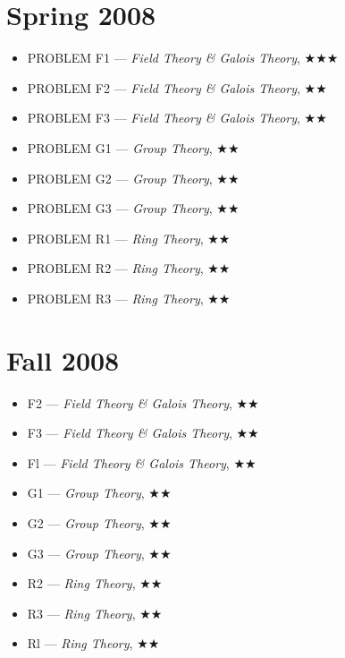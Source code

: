 \documentclass[11pt,letterpaper]{book}
\begin{document}
\section*{Spring 2008}
\begin{itemize}
\item PROBLEM F1 --- \textit{Field Theory \& Galois Theory}, $\bigstar\bigstar\bigstar$
\item PROBLEM F2 --- \textit{Field Theory \& Galois Theory}, $\bigstar\bigstar$
\item PROBLEM F3 --- \textit{Field Theory \& Galois Theory}, $\bigstar\bigstar$
\item PROBLEM G1 --- \textit{Group Theory}, $\bigstar\bigstar$
\item PROBLEM G2 --- \textit{Group Theory}, $\bigstar\bigstar$
\item PROBLEM G3 --- \textit{Group Theory}, $\bigstar\bigstar$
\item PROBLEM R1 --- \textit{Ring Theory}, $\bigstar\bigstar$
\item PROBLEM R2 --- \textit{Ring Theory}, $\bigstar\bigstar$
\item PROBLEM R3 --- \textit{Ring Theory}, $\bigstar\bigstar$
\end{itemize}

\section*{Fall 2008}
\begin{itemize}
\item F2 --- \textit{Field Theory \& Galois Theory}, $\bigstar\bigstar$
\item F3 --- \textit{Field Theory \& Galois Theory}, $\bigstar\bigstar$
\item Fl --- \textit{Field Theory \& Galois Theory}, $\bigstar\bigstar$
\item G1 --- \textit{Group Theory}, $\bigstar\bigstar$
\item G2 --- \textit{Group Theory}, $\bigstar\bigstar$
\item G3 --- \textit{Group Theory}, $\bigstar\bigstar$
\item R2 --- \textit{Ring Theory}, $\bigstar\bigstar$
\item R3 --- \textit{Ring Theory}, $\bigstar\bigstar$
\item Rl --- \textit{Ring Theory}, $\bigstar\bigstar$
\end{itemize}
\end{document}
